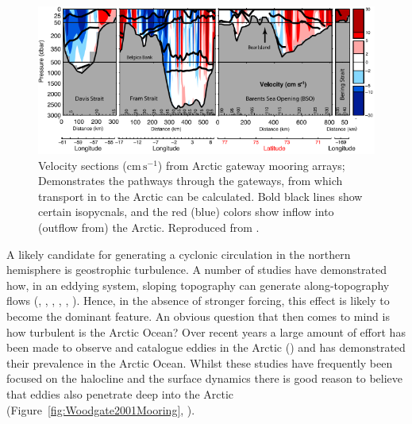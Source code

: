 \documentclass[12pt,a4paper]{report}
\newcommand*\figref[1]{Figure~\ref{#1}}
\begin{document}
\begin{figure}
	\centering
	\includegraphics[width=\linewidth]{Tsubouchi2012Transport}
	\caption[Adapted from \cite{tsubouchi2012arctic}]{Velocity
		sections ($\mathrm{cm}\, \mathrm{s}^{-1}$) from Arctic gateway mooring arrays;
		Demonstrates the pathways through the gateways, from which transport 
		in to the Arctic can be calculated.
		Bold black lines show certain isopycnals, and the red (blue) colors show inflow
		into (outflow from) the Arctic. Reproduced from \cite{tsubouchi2012arctic}.}
	\label{fig:Tsubouchi2012Transport}
\end{figure}

A likely candidate for generating a cyclonic circulation in the northern hemisphere is
geostrophic turbulence. A number of studies have demonstrated how, in an eddying system, 
sloping topography can generate along-topography flows (\cite{bretherton1976two},  \cite{rhines1982homogenization},
\cite{treguier1989topographically}, \cite{salmon1998lectures}, \cite{adcock2000interactions}, \cite{nost2008asymmetry}). Hence, in the absence of stronger
forcing, this effect is likely to become the dominant feature. An obvious question that then
comes to mind is how turbulent is the Arctic Ocean? Over recent years a large amount  of 
effort has been made to observe and catalogue eddies in the Arctic
(\cite{zhao2014characterizing}) and has demonstrated their prevalence in the Arctic Ocean.
Whilst these studies have frequently been focused on the halocline and the surface dynamics
there is good reason to believe that eddies also penetrate deep into the Arctic 
(\figref{fig:Woodgate2001Mooring}, \cite{woodgate2001arctic}).
\end{document}
